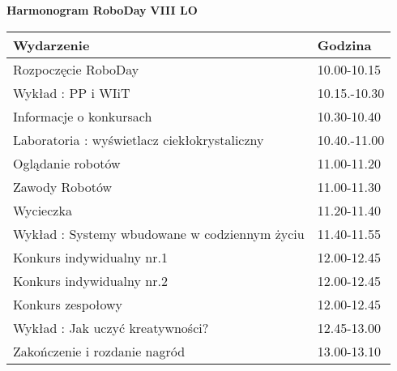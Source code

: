 \documentclass{article}
\begin{document}
\begin{center}
\Large\textbf{Harmonogram RoboDay}
\large\textbf{VIII LO}
\end{center}
\vspace{1cm}
\begin{center}
\begin{tabular}{|l|l|}
\hline
\textbf{Wydarzenie} & \textbf{Godzina} \\
\hline
Rozpoczęcie RoboDay & 10.00-10.15 \\
\hline
Wykład : PP i WIiT & 10.15.-10.30 \\
\hline
Informacje o konkursach & 10.30-10.40 \\
\hline
Laboratoria : wyświetlacz ciekłokrystaliczny & 10.40.-11.00 \\
\hline
Oglądanie robotów & 11.00-11.20 \\
\hline
Zawody Robotów & 11.00-11.30 \\
\hline
Wycieczka & 11.20-11.40 \\
\hline
Wykład : Systemy wbudowane w codziennym życiu & 11.40-11.55 \\
\hline
Konkurs indywidualny nr.1 & 12.00-12.45 \\
\hline
Konkurs indywidualny nr.2 & 12.00-12.45 \\
\hline
Konkurs zespołowy & 12.00-12.45 \\
\hline
Wykład : Jak uczyć kreatywności? & 12.45-13.00 \\
\hline
Zakończenie i rozdanie nagród & 13.00-13.10 \\
\hline
\end{tabular}
\end{center}
\end{document}
